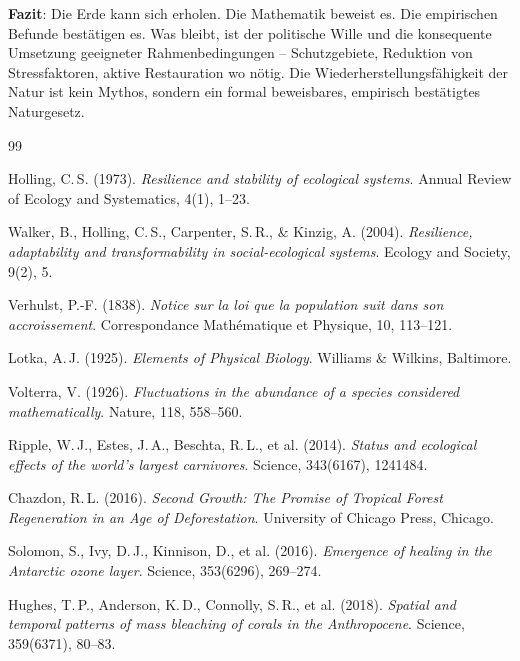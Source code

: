 ﻿\documentclass[a4paper,12pt]{article}
\theoremstyle{definition}
\begin{document}
\medskip
\noindent\textbf{Fazit}: Die Erde kann sich erholen. Die Mathematik beweist es. Die empirischen Befunde bestätigen es. Was bleibt, ist der politische Wille und die konsequente Umsetzung geeigneter Rahmenbedingungen -- Schutzgebiete, Reduktion von Stressfaktoren, aktive Restauration wo nötig. Die Wiederherstellungsfähigkeit der Natur ist kein Mythos, sondern ein formal beweisbares, empirisch bestätigtes Naturgesetz.

\begin{thebibliography}{99}

Holling, C.\,S. (1973).
\textit{Resilience and stability of ecological systems}.
Annual Review of Ecology and Systematics, 4(1), 1--23.

Walker, B., Holling, C.\,S., Carpenter, S.\,R., \& Kinzig, A. (2004).
\textit{Resilience, adaptability and transformability in social-ecological systems}.
Ecology and Society, 9(2), 5.

Verhulst, P.-F. (1838).
\textit{Notice sur la loi que la population suit dans son accroissement}.
Correspondance Mathématique et Physique, 10, 113--121.

Lotka, A.\,J. (1925).
\textit{Elements of Physical Biology}.
Williams \& Wilkins, Baltimore.

Volterra, V. (1926).
\textit{Fluctuations in the abundance of a species considered mathematically}.
Nature, 118, 558--560.

Ripple, W.\,J., Estes, J.\,A., Beschta, R.\,L., et al. (2014).
\textit{Status and ecological effects of the world's largest carnivores}.
Science, 343(6167), 1241484.

Chazdon, R.\,L. (2016).
\textit{Second Growth: The Promise of Tropical Forest Regeneration in an Age of Deforestation}.
University of Chicago Press, Chicago.

Solomon, S., Ivy, D.\,J., Kinnison, D., et al. (2016).
\textit{Emergence of healing in the Antarctic ozone layer}.
Science, 353(6296), 269--274.

Hughes, T.\,P., Anderson, K.\,D., Connolly, S.\,R., et al. (2018).
\textit{Spatial and temporal patterns of mass bleaching of corals in the Anthropocene}.
Science, 359(6371), 80--83.


\end{thebibliography}
\end{document}
